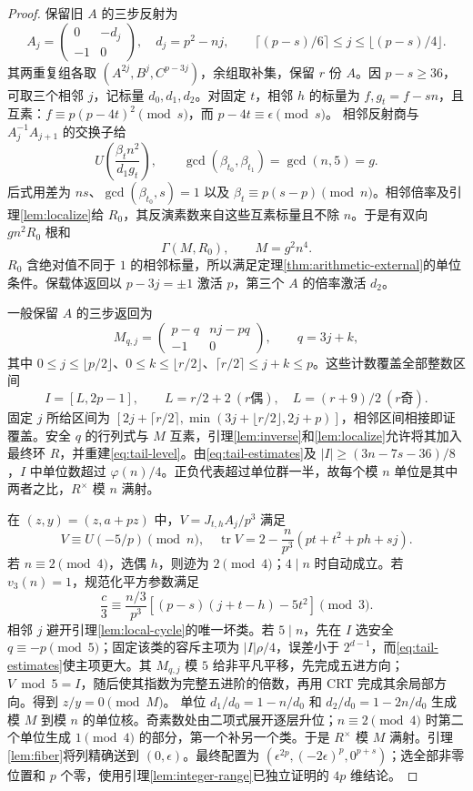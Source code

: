 \documentclass[11pt,a4paper]{article}
\theoremstyle{definition}
\numberwithin{equation}{section}
\begin{document}
\begin{proof}
保留旧 $A$ 的三步反射为
\[
A_j=\begin{pmatrix}0&-d_j\\-1&0\end{pmatrix},\quad d_j=p^2-nj,\qquad
\lceil(p-s)/6\rceil\le j\le\lfloor(p-s)/4\rfloor.
\]
其两重复组各取 $(A^{2j},B^j,C^{p-3j})$，余组取补集，保留 $r$ 份 $A$。因 $p-s\ge36$，可取三个相邻 $j$，记标量 $d_0,d_1,d_2$。对固定 $t$，相邻 $h$ 的标量为 $f,g_t=f-sn$，且互素：$f\equiv p(p-4t)^2\pmod s$，而 $p-4t\equiv\epsilon\pmod s$。
相邻反射商与 $A_j^{-1}A_{j+1}$ 的交换子给
\[
U\left(\frac{\beta_t n^2}{d_1g_t}\right),\qquad
\gcd(\beta_{t_0},\beta_{t_1})=\gcd(n,5)=g.
\]
后式用差为 $ns$、$\gcd(\beta_{t_0},s)=1$ 以及 $\beta_t\equiv p(s-p)\pmod n$。相邻倍率及引理\ref{lem:localize}给 $R_0$，其反演素数来自这些互素标量且不除 $n$。于是有双向 $gn^2R_0$ 根和
\begin{equation}\label{eq:tail-level}
\Gamma(M,R_0),\qquad M=g^2n^4.
\end{equation}
$R_0$ 含绝对值不同于 $1$ 的相邻标量，所以满足定理\ref{thm:arithmetic-external}的单位条件。保载体返回以 $p-3j=\pm1$ 激活 $p$，第三个 $A$ 的倍率激活 $d_2$。

一般保留 $A$ 的三步返回为
\[
M_{q,j}=\begin{pmatrix}p-q&nj-pq\\-1&0\end{pmatrix},\qquad q=3j+k,
\]
其中 $0\le j\le\lfloor p/2\rfloor$、$0\le k\le\lfloor r/2\rfloor$、$\lceil r/2\rceil\le j+k\le p$。这些计数覆盖全部整数区间
\[
I=[L,2p-1],\qquad L=r/2+2\ (r\text{偶}),\quad L=(r+9)/2\ (r\text{奇}).
\]
固定 $j$ 所给区间为 $[2j+\lceil r/2\rceil,\min(3j+\lfloor r/2\rfloor,2j+p)]$，相邻区间相接即证覆盖。安全 $q$ 的行列式与 $M$ 互素，引理\ref{lem:inverse}和\ref{lem:localize}允许将其加入最终环 $R$，并重建\eqref{eq:tail-level}。由\eqref{eq:tail-estimates}及 $|I|\ge(3n-7s-36)/8$，$I$ 中单位数超过 $\varphi(n)/4$。正负代表超过单位群一半，故每个模 $n$ 单位是其中两者之比，$R^\times$ 模 $n$ 满射。

在 $(z,y)=(z,a+pz)$ 中，$V=J_{t,h}A_j/p^3$ 满足
\[
V\equiv U(-5/p)\pmod n,\quad
\operatorname{tr}V=2-\frac n{p^3}(pt+t^2+ph+sj).
\]
若 $n\equiv2\pmod4$，选偶 $h$，则迹为 $2\pmod4$；$4\mid n$ 时自动成立。若 $v_3(n)=1$，规范化平方参数满足
\[
\frac c3\equiv\frac{n/3}{p^3}[(p-s)(j+t-h)-5t^2]\pmod3.
\]
相邻 $j$ 避开引理\ref{lem:local-cycle}的唯一坏类。若 $5\mid n$，先在 $I$ 选安全 $q\equiv-p\pmod5$；固定该类的容斥主项为 $|I|\rho/4$，误差小于 $2^{d-1}$，而\eqref{eq:tail-estimates}使主项更大。其 $M_{q,j}$ 模 $5$ 给非平凡平移，先完成五进方向；$V\bmod5=I$，随后使其指数为完整五进阶的倍数，再用 CRT 完成其余局部方向。得到 $z/y=0\pmod M$。
单位 $d_1/d_0=1-n/d_0$ 和 $d_2/d_0=1-2n/d_0$ 生成模 $M$ 到模 $n$ 的单位核。奇素数处由二项式展开逐层升位；$n\equiv2\pmod4$ 时第二个单位生成 $1\pmod4$ 的部分，第一个补另一个类。于是 $R^\times$ 模 $M$ 满射。引理\ref{lem:fiber}将列精确送到 $(0,\epsilon)$。最终配置为 $(\epsilon^{2p},(-2\epsilon)^p,0^{p+s})$；选全部非零位置和 $p$ 个零，使用引理\ref{lem:integer-range}已独立证明的 $4p$ 维结论。
\end{proof}
\end{document}
